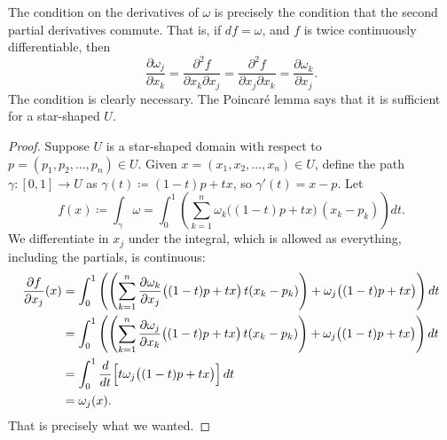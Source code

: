 The condition on the derivatives of $\omega$ is precisely the condition
that the second partial derivatives commute.  That is, if $df = \omega$,
and $f$ is twice continuously differentiable, then
\begin{equation*}
\frac{\partial \omega_j}{\partial x_k}
=
\frac{\partial^2 f}{\partial x_k \partial x_j} 
=
\frac{\partial^2 f}{\partial x_j \partial x_k} 
=
\frac{\partial \omega_k}{\partial x_j} .
\end{equation*}
The condition is clearly necessary.  The Poincar\'e lemma says that it is
sufficient for a star-shaped $U$.

\begin{proof}
Suppose $U$ is a star-shaped domain with respect to $p=(p_1,p_2,\ldots,p_n) \in U$.
Given $x = (x_1,x_2,\ldots,x_n) \in U$, define the path $\gamma \colon [0,1] \to U$ as
$\gamma(t) \coloneqq (1-t)p + tx$, so $\gamma'(t) = x-p$.  Let
\begin{equation*}
f(x) \coloneqq \int_{\gamma} \omega
=
\int_0^1
\left(
\sum_{k=1}^n
\omega_k \bigl((1-t)p + tx \bigr) \, (x_k-p_k)
\right) dt .
\end{equation*}
We differentiate in $x_j$ under the integral, which is allowed as
everything, including the partials, is continuous:
\begin{equation*}
\begin{split}
\frac{\partial f}{\partial x_j}(x) & =
\int_0^1
\left(
\left(
\sum_{k=1}^n
\frac{\partial \omega_k}{\partial x_j} \bigl((1-t)p + tx \bigr) \, t
(x_k-p_k)
\right)
+
\omega_j \bigl((1-t)p + tx \bigr)
\right)
 dt
\\
& = 
\int_0^1
\left(
\left(
\sum_{k=1}^n
\frac{\partial \omega_j}{\partial x_k} \bigl((1-t)p + tx \bigr) \, t
(x_k-p_k)
\right)
+
\omega_j \bigl((1-t)p + tx \bigr)
\right) dt
\\
& = 
\int_0^1
\frac{d}{dt}
\Bigl[
t \omega_j\bigl((1-t)p + tx \bigr)
\Bigr]
\,
dt
\\
&= \omega_j(x) .
\end{split}
\end{equation*}
That is precisely what we wanted.
\end{proof}

